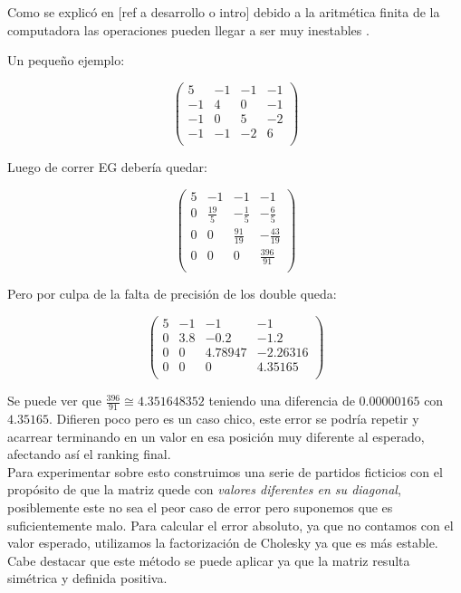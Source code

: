Como se explicó en [ref a desarrollo o intro] debido a la aritmética finita de la computadora %
las operaciones pueden llegar a ser muy inestables \cite{arithmetic}.

Un pequeño ejemplo:

$$\begin{pmatrix}
    5 & -1 & -1 & -1 \\
    -1 & 4 & 0 & -1 \\
    -1 & 0 & 5 & -2 \\
    -1 & -1 & -2 & 6 \\
\end{pmatrix}$$

Luego de correr EG debería quedar:

$$\begin{pmatrix}
    5 & -1 & -1 & -1 \\
    0 & \frac{19}{5} & -\frac{1}{5} & -\frac{6}{5} \\
    0 & 0 & \frac{91}{19} & -\frac{43}{19} \\
    0 & 0 & 0 & \frac{396}{91} \\
\end{pmatrix}$$

Pero por culpa de la falta de precisión de los double queda:

$$\begin{pmatrix}
    5 & -1 & -1 & -1 \\
    0 & 3.8 & -0.2 & -1.2 \\
    0 & 0 & 4.78947 & -2.26316 \\
    0 & 0 & 0 & 4.35165 \\
\end{pmatrix}$$

Se puede ver que $\frac{396}{91} \cong 4.351648352$ teniendo una diferencia de $0.00000165$ con $4.35165$.
Difieren poco pero es un caso chico, este error se podría repetir y acarrear terminando en un valor en esa posición muy diferente al esperado, afectando así el ranking final.\\

Para experimentar sobre esto construimos una serie de partidos ficticios con el propósito de que la matriz quede con \textit{valores diferentes en su diagonal}, posiblemente este no sea el peor caso de error pero suponemos que es suficientemente malo. Para calcular el error absoluto, ya que no contamos con el valor esperado, utilizamos la factorización de Cholesky ya que es más estable. Cabe destacar que este método se puede aplicar ya que la matriz resulta simétrica y definida positiva\cite{CMMpaper}.\\

